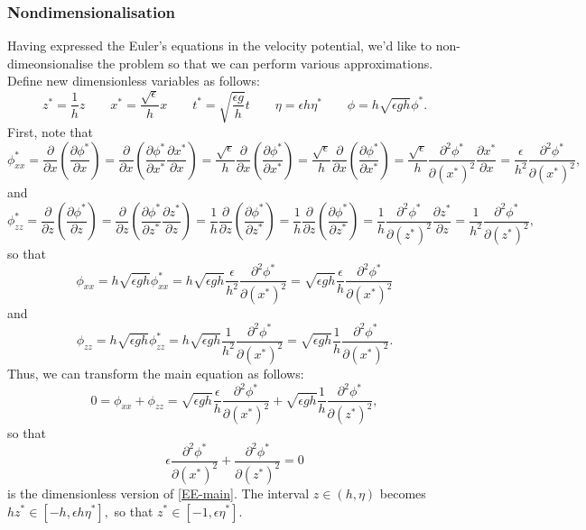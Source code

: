 \documentclass[10pt,reqno,oneside,a4paper]{article}
\begin{document}
\subsubsection{Nondimensionalisation}
Having expressed the Euler's equations in the velocity potential, we'd like to non-dimeonsionalise the problem so that we can perform various approximations. Define new dimensionless variables as follows:
\[ 
z^* = \frac{1}{h}z \qquad x^* = \frac{\sqrt{\epsilon}}{h}x \qquad t^* = \sqrt{\frac{\epsilon g}{h}}t \qquad \eta = \epsilon h \eta^* \qquad \phi  = h\sqrt{\epsilon g h} \phi^*.
\]
First, note that 
\[ 
\phi^*_{xx} = \frac{\partial}{\partial x} \left( \frac{\partial \phi^*}{\partial x}\right) = \frac{\partial}{\partial x} \left( \frac{\partial \phi^*}{\partial x^*} \frac{\partial x^*}{\partial x}\right) =  \frac{\sqrt{\epsilon}}{h} \frac{\partial}{\partial x} \left( \frac{\partial \phi^*}{\partial x^*}\right) = \frac{\sqrt{\epsilon}}{h} \frac{\partial}{\partial x} \left( \frac{\partial \phi^*}{\partial x^*}\right) = \frac{\sqrt{\epsilon}}{h} \frac{\partial^2 \phi^*}{\partial (x^*)^2} \frac{\partial x^*}{\partial x} = \frac{\epsilon}{h^2}\frac{\partial^2 \phi^*}{\partial (x^*)^2},
\]
and
\[ 
\phi^*_{zz} = \frac{\partial}{\partial z} \left( \frac{\partial \phi^*}{\partial z}\right) = \frac{\partial}{\partial z} \left( \frac{\partial \phi^*}{\partial z^*} \frac{\partial z^*}{\partial z}\right) =  \frac{1}{h} \frac{\partial}{\partial z} \left(\frac{\partial \phi^*}{\partial z^*}\right) = \frac{1}{h} \frac{\partial}{\partial z} \left( \frac{\partial \phi^*}{\partial z^*}\right) = \frac{1}{h} \frac{\partial^2 \phi^*}{\partial (z^*)^2} \frac{\partial z^*}{\partial z} = \frac{1}{h^2}\frac{\partial^2 \phi^*}{\partial (z^*)^2},
\]
so that 
\[ 
\phi_{xx} = h\sqrt{\epsilon g h} \phi^*_{xx} = h\sqrt{\epsilon g h} \frac{\epsilon}{h^2}\frac{\partial^2 \phi^*}{\partial (x^*)^2}  = \sqrt{\epsilon g h} \frac{\epsilon}{h}\frac{\partial^2 \phi^*}{\partial (x^*)^2} 
\]
and
\[ 
\phi_{zz} = h\sqrt{\epsilon g h} \phi^*_{zz} = h\sqrt{\epsilon g h} \frac{1}{h^2}\frac{\partial^2 \phi^*}{\partial (x^*)^2}  = \sqrt{\epsilon g h} \frac{1}{h}\frac{\partial^2 \phi^*}{\partial (x^*)^2}. 
\]
Thus, we can transform the main equation as follows:
\[ 
0 = \phi_{xx} + \phi_{zz} =  \sqrt{\epsilon g h} \frac{\epsilon}{h}\frac{\partial^2 \phi^*}{\partial (x^*)^2} + \sqrt{\epsilon g h} \frac{1}{h}\frac{\partial^2 \phi^*}{\partial (z^*)^2},
\]
so that 
\[ 
\epsilon \frac{\partial^2 \phi^*}{\partial (x^*)^2}  + \frac{\partial^2 \phi^*}{\partial (z^*)^2} = 0
\]
is the dimensionless version of \eqref{EE-main}. The interval $z \in (h, \eta)$ becomes $hz^* \in [-h, \epsilon h \eta^*],$ so that $z^* \in [-1, \epsilon \eta^*].$
\end{document}
